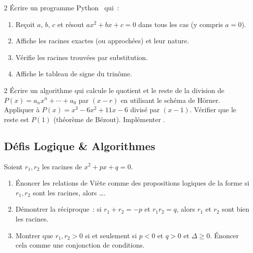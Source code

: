 \begin{probleme}{2}
\'Ecrire un programme Python \computer\ qui~:
\begin{enumerate}
  \item Re\c coit $a$, $b$, $c$ et r\'esout $ax^2+bx+c=0$ dans tous les cas
        (y compris $a=0$).
  \item Affiche les racines exactes (ou approch\'ees) et leur nature.
  \item V\'erifie les racines trouv\'ees par substitution.
  \item Affiche le tableau de signe du trin\^ome.
\end{enumerate}
\end{probleme}

\begin{probleme}{2}
\'Ecrire un algorithme qui calcule le quotient et le reste
de la division de $P(x)=a_nx^n+\cdots+a_0$ par $(x-r)$
en utilisant le sch\'ema de H\"orner.
Appliquer \`a $P(x)=x^3-6x^2+11x-6$ divis\'e par $(x-1)$.
V\'erifier que le reste est $P(1)$ (th\'eor\`eme de B\'ezout).
Impl\'ementer \computer.
\end{probleme}

\subsection*{D\'efis Logique \& Algorithmes}

\begin{challenge}
Soient $r_1,r_2$ les racines de $x^2+px+q=0$.
\begin{enumerate}
  \item \'Enoncer les relations de Vi\`ete comme des propositions logiques
        de la forme \og si $r_1,r_2$ sont les racines, alors \ldots\fg.
  \item D\'emontrer la r\'eciproque~: si $r_1+r_2=-p$ et $r_1r_2=q$,
        alors $r_1$ et $r_2$ sont bien les racines.
  \item Montrer que $r_1,r_2>0$ si et seulement si $p<0$ et $q>0$ et $\Delta\geq0$.
        \'Enoncer cela comme une conjonction de conditions.
\end{enumerate}
\end{challenge}

